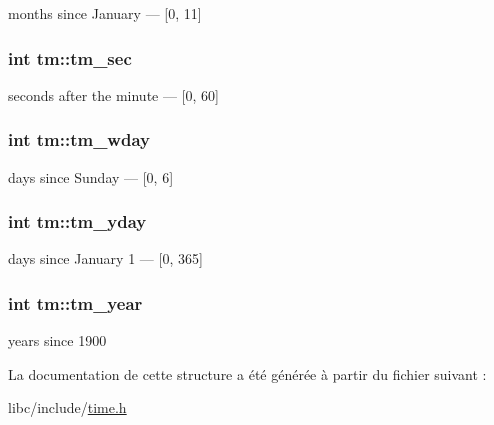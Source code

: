 months since January — \mbox{[}0, 11\mbox{]} \hypertarget{structtm_a4d098a9a5c03a00b2ee61e10851de81e}{
\subsubsection[{tm\-\_\-sec}]{\setlength{\rightskip}{0pt plus 5cm}int tm\-::tm\-\_\-sec}}\label{structtm_a4d098a9a5c03a00b2ee61e10851de81e}
seconds after the minute — \mbox{[}0, 60\mbox{]} \hypertarget{structtm_afe81a8c46f1c693c43f259b288859f4f}{
\subsubsection[{tm\-\_\-wday}]{\setlength{\rightskip}{0pt plus 5cm}int tm\-::tm\-\_\-wday}}\label{structtm_afe81a8c46f1c693c43f259b288859f4f}
days since Sunday — \mbox{[}0, 6\mbox{]} \hypertarget{structtm_a93a0ba77cc23796df84405dcbcc57eb1}{
\subsubsection[{tm\-\_\-yday}]{\setlength{\rightskip}{0pt plus 5cm}int tm\-::tm\-\_\-yday}}\label{structtm_a93a0ba77cc23796df84405dcbcc57eb1}
days since January 1 — \mbox{[}0, 365\mbox{]} \hypertarget{structtm_a33adf78fd6476b2120ce3b9c4a852053}{
\subsubsection[{tm\-\_\-year}]{\setlength{\rightskip}{0pt plus 5cm}int tm\-::tm\-\_\-year}}\label{structtm_a33adf78fd6476b2120ce3b9c4a852053}
years since 1900 

La documentation de cette structure a été générée à partir du fichier suivant \-:\begin{DoxyCompactItemize}
\item 
libc/include/\hyperlink{time_8h}{time.\-h}\end{DoxyCompactItemize}
